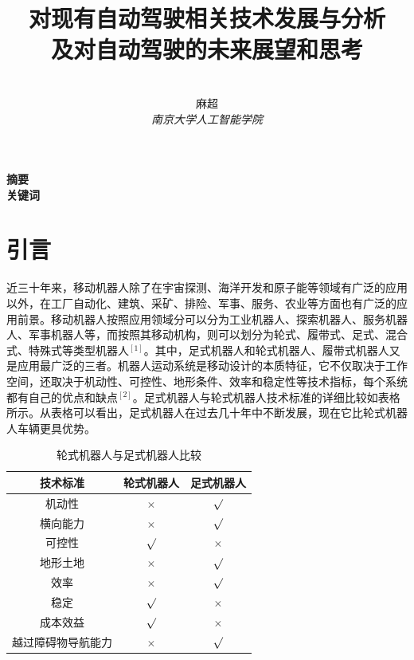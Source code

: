 \documentclass[12pt,a4paper]{ctexart}
\title{\textbf{对现有自动驾驶相关技术发展与分析\\及对自动驾驶的未来展望和思考}}%
\author{
\\
\Large{麻超 \quad 201300066}
\\[6pt]
{ \large \textit{南京大学人工智能学院}}\\[2pt]
}
\date{}
\begin{document}
\maketitle
\setcounter{page}{1}
\textbf{摘要}  \\

\textbf{关键词}
\\[60pt]

\section*{引言}

近三十年来，移动机器人除了在宇宙探测、海洋开发和原子能等领域有广泛的应用以外，在工厂自动化、建筑、采矿、排险、军事、服务、农业等方面也有广泛的应用前景。移动机器人按照应用领域分可以分为工业机器人、探索机器人、服务机器人、军事机器人等，而按照其移动机构，则可以划分为轮式、履带式、足式、混合式、特殊式等类型机器人$^{[1]}$。其中，足式机器人和轮式机器人、履带式机器人又是应用最广泛的三者。机器人运动系统是移动设计的本质特征，它不仅取决于工作空间，还取决于机动性、可控性、地形条件、效率和稳定性等技术指标，每个系统都有自己的优点和缺点$^{[2]}$。足式机器人与轮式机器人技术标准的详细比较如表格所示。从表格可以看出，足式机器人在过去几十年中不断发展，现在它比轮式机器人车辆更具优势。
\begin{table}[ht]
	\centering
	\caption{轮式机器人与足式机器人比较}\label{}
	\tabcolsep 15pt
	\begin{tabular}{c|c|c}
		\hline
		技术标准           & 轮式机器人 & 足式机器人 \\
		\hline
		机动性             & $\times$   & $\surd$    \\
		横向能力           & $\times$   & $\surd$    \\
		可控性             & $\surd$    & $\times$   \\
		地形土地           & $\times$   & $\surd$    \\
		效率               & $\times$   & $\surd$    \\
		稳定               & $\surd$    & $\times$   \\
		成本效益           & $\surd$    & $\times$   \\
		越过障碍物导航能力 & $\times$   & $\surd$    \\
		\hline
	\end{tabular}
\end{table}
\end{document}
